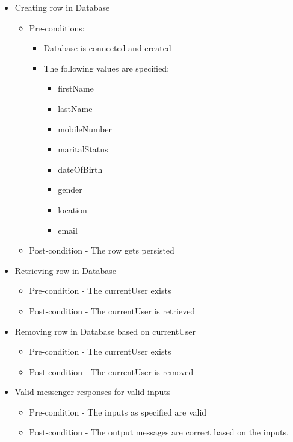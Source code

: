 \documentclass{article}
\begin{document}
\begin{itemize}
\item Creating row in Database
\begin{itemize}
	\item Pre-conditions:
		\begin{itemize}
		\item Database is connected and created
		\item The following values are specified:  
		\begin{itemize}
		\item firstName
  		\item lastName
  		\item mobileNumber 
  		\item maritalStatus 
  		\item dateOfBirth 
 		\item gender
  		\item location 
 		\item email
 		\end{itemize} 
		\end{itemize}
\item Post-condition - The row gets persisted
\end{itemize}
\item Retrieving row in Database
	\begin{itemize}
	\item Pre-condition - The currentUser exists
	\item Post-condition - The currentUser is retrieved 
	\end{itemize}

\item Removing row in Database based on currentUser 
	\begin{itemize}
	\item Pre-condition - The currentUser exists
	\item Post-condition - The currentUser is removed
	\end{itemize}

\item Valid messenger responses for valid inputs
	\begin{itemize}
	\item Pre-condition - The inputs as specified are valid
	\item Post-condition - The output messages are correct based on the inputs.
	\end{itemize}
	

\end{itemize}
\end{document}
